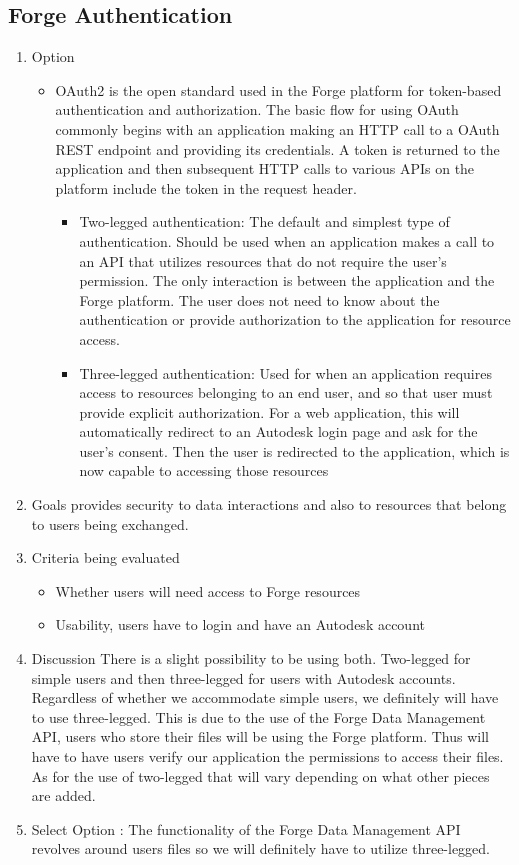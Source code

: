 \documentclass[letterpaper, 10pt, draftclsnofoot, compsoc, onecolumn]{IEEEtran}
\begin{document}
	\subsection{Forge Authentication}
		\begin{enumerate}
			\item{Option}
				\begin{itemize}
					\item OAuth2 is the open standard used in the Forge platform for token-based authentication and authorization. The basic flow for using OAuth commonly begins with an application making an HTTP call to a OAuth REST endpoint and providing its credentials. A token is returned to the application and then subsequent HTTP calls to various APIs on the platform include the token in the request header.
					\begin{itemize}
						\item Two-legged authentication: The default and simplest type of authentication. Should be used when an application makes a call to an API that utilizes resources that do not require the user's permission. The only interaction is between the application and the Forge platform. The user does not need to know about the authentication or provide authorization to the application for resource access.
						\item Three-legged authentication: Used for when an application requires access to resources belonging to an end user, and so that user must provide explicit authorization. For a web application, this will automatically redirect to an Autodesk login page and ask for the user's consent. Then the user is redirected to the application, which is now capable to accessing those resources
					\end{itemize}
				\end{itemize}
			\item{Goals} provides security to data interactions and also to resources that belong to users being exchanged.
			\item{Criteria being evaluated}
				\begin{itemize}
					\item{Whether users will need access to Forge resources}
					\item{Usability, users have to login and have an Autodesk account}
				\end{itemize}
			\item{Discussion} There is a slight possibility to be using both. Two-legged for simple users and then three-legged for users with Autodesk accounts. Regardless of whether we accommodate simple users, we definitely will have to use three-legged. This is due to the use of the Forge Data Management API, users who store their files will be using the Forge platform. Thus will have to have users verify our application the permissions to access their files. As for the use of two-legged that will vary depending on what other pieces are added.

			\item{Select Option} : The functionality of the Forge Data Management API revolves around users files so we will definitely have to utilize three-legged.
		\end{enumerate}
\end{document}
